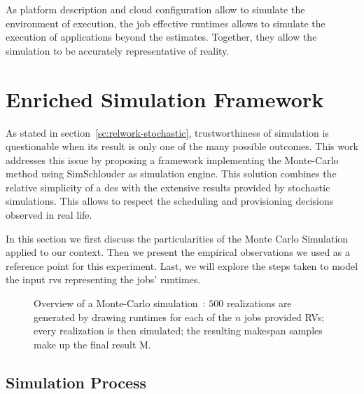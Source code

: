 \documentclass[10pt,conference,compsocconf]{IEEEtran}
\begin{document}
As platform description and cloud configuration allow to simulate the environment of 
execution, the job effective runtimes allows to simulate the execution of 
applications beyond the estimates. Together, they allow the simulation to be 
accurately representative of reality.

\section{Enriched Simulation Framework}\label{sec:enriched-sim}


As stated in  section~\ref{sc:relwork-stochastic}, trustworthiness of simulation
is questionable when its result is only one of the many possible outcomes. This
work addresses this issue by  proposing a framework implementing the Monte-Carlo
method using SimSchlouder  as  simulation engine.   This  solution combines  the
relative  simplicity  of a  \ac{des}  with  the  extensive results  provided  by
stochastic simulations.   This allows to respect the scheduling and provisioning 
decisions observed in real life. 

In  this  section we  first  discuss  the  particularities  of the  Monte  Carlo
Simulation applied to our context. Then we present the empirical observations we
used as a reference point for this experiment. Last, we will explore the steps
taken to model the input \acp{rv} representing the jobs' runtimes.

\begin{figure}
	\centering
	\resizebox{0.5\textwidth}{!}{%
		
		}
\caption{Overview of a Monte-Carlo simulation~: $500$ realizations are generated
by drawing runtimes for each of the $n$ jobs provided RVs; every realization is
then simulated; the resulting makespan samples make up the final result M.}\label{fig:mc-process}
\end{figure}

\subsection{Simulation Process}

\end{document}
